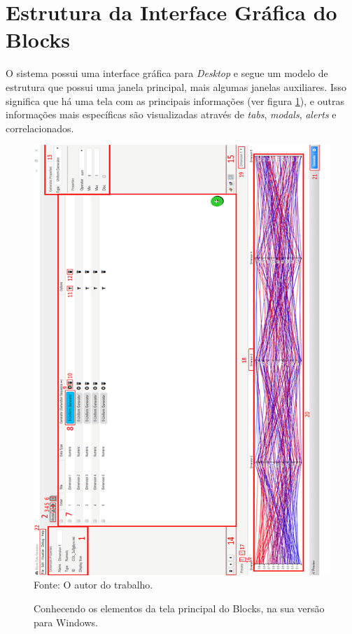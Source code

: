 \documentclass[
	12pt,				%
	openright,			%
	oneside,			%
	a4paper,			%
	english,			%
	brazil				%
	]{abntex2}
\begin{document}
	\section{Estrutura da Interface Gráfica do Blocks}
		O sistema possui uma interface gráfica para \emph{Desktop} e segue um modelo de estrutura que possui uma janela principal, mais algumas janelas auxiliares.
		Isso significa que há uma tela com as principais informações (ver figura \ref{fig:telaPrincipal}), e outras informações mais específicas são visualizadas através de \emph{tabs}, \emph{modals}, \emph{alerts} e correlacionados.
		\begin{figure}[h]
			\centering
			\caption{Conhecendo os elementos da tela principal do Blocks, na sua versão para Windows.}
			\includegraphics[width=\linewidth]{./figures/prototipo/telaprincipalmarcada.png}
			\label{fig:telaPrincipal}
			\footnotesize Fonte: O autor do trabalho.
		\end{figure}
\end{document}
